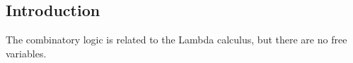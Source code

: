 
\subsection{Introduction}

The combinatory logic is related to the Lambda calculus, but there are no free variables.

